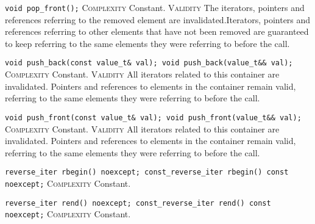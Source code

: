\noindent{}\hspace*{0.25em}\lstinline[basicstyle=\ttfamily\color{cgreen}]{void pop_front();} \textsc{Complexity} Constant. \textsc{Validity} The iterators, pointers and references referring to the removed element are invalidated.Iterators, pointers and references referring to other elements that have not been removed are guaranteed to keep referring to the same elements they were referring to before the call.\\\vspace{-0.6em}

\noindent{}\hspace*{0.25em}\lstinline[basicstyle=\ttfamily\color{cgreen}]{void push_back(const value_t& val); void push_back(value_t&& val);} \textsc{Complexity} Constant. \textsc{Validity} All iterators related to this container are invalidated. Pointers and references to elements in the container remain valid, referring to the same elements they were referring to before the call.\\\vspace{-0.6em}

\noindent{}\hspace*{0.25em}\lstinline[basicstyle=\ttfamily\color{cgreen}]{void push_front(const value_t& val); void push_front(value_t&& val);} \textsc{Complexity} Constant. \textsc{Validity} All iterators related to this container are invalidated. Pointers and references to elements in the container remain valid, referring to the same elements they were referring to before the call.\\\vspace{-0.6em}

\noindent{}\hspace*{0.25em}\lstinline[basicstyle=\ttfamily\color{cgreen}]{reverse_iter rbegin() noexcept; const_reverse_iter rbegin() const noexcept;} \textsc{Complexity} Constant.\\\vspace{-0.6em}

\noindent{}\hspace*{0.25em}\lstinline[basicstyle=\ttfamily\color{cgreen}]{reverse_iter rend() noexcept; const_reverse_iter rend() const noexcept;} \textsc{Complexity} Constant.\\\vspace{-0.6em}

